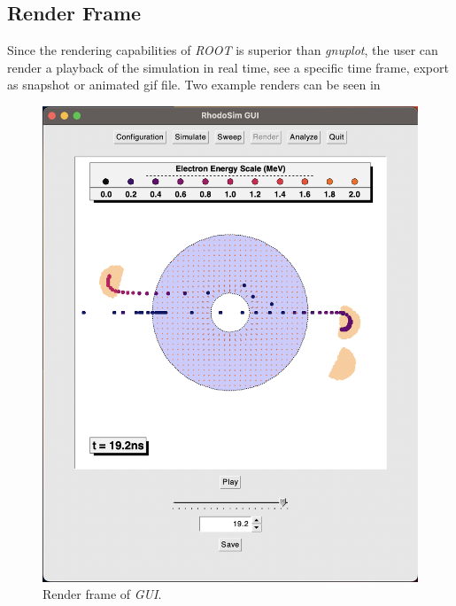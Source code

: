 \documentclass[a4paper,oneside,12pt]{report}
\numberwithin{equation}{chapter}
\begin{document}
\subsection{Render Frame}
Since the rendering capabilities of \textit{ROOT} is superior than \textit{gnuplot}, the user can render a playback of the simulation in real time, 
see a specific time frame, export as snapshot or animated gif file.
Two example renders can be seen in 
\begin{figure}
    \centering
    \includegraphics[width=\linewidth]{./figures/rhodoSim/GUI_render_frame_1.png}
    \caption{Render frame of \textit{GUI}.}
    \label{fig:gui_render_1}
\end{figure}
\end{document}
